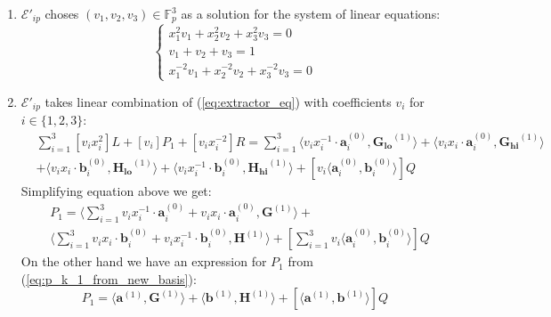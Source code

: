 \documentclass[../lecture-notes-148x210.tex]{subfiles}
\begin{document}
\begin{enumerate}
    \item $\mathcal{E}'_{ip}$ choses $(v_1, v_2, v_3) \in \mathbb{F}_p^3 $ as a solution for the system of linear equations:
        \begin{equation}
            \begin{cases}
                x_1^2 v_1 + x_2^2 v_2 + x_3^2 v_3 = 0 \\
                v_1 + v_2 + v_3 = 1 \\
                x_1^{-2} v_1 + x_2^{-2} v_2 + x_3^{-2} v_3 = 0
            \end{cases}
            \label{eq:extractor_v}
        \end{equation}
    \item $\mathcal{E}'_{ip}$ takes linear combination of (\ref{eq:extractor_eq}) with coefficients $v_i$ for $i \in \{ 1,2,3 \}$:
        \begin{equation*}
            \begin{aligned}
                & \sum_{i=1}^3 [v_i x_i^2]L + [v_i]P_1 + [v_i x_i^{-2}]R = \sum_{i=1}^3 \langle v_i x_i^{-1} \cdot \mathbf{a}_i^{(0)}, \mathbf{G_{lo}}^{(1)} \rangle + \langle v_i x_i \cdot \mathbf{a}_i^{(0)}, \mathbf{G_{hi}}^{(1)} \rangle \\
                &+ \langle v_i x_i \cdot \mathbf{b}_i^{(0)}, \mathbf{H_{lo}}^{(1)} \rangle + \langle v_i x_i^{-1} \cdot \mathbf{b}_i^{(0)}, \mathbf{H_{hi}}^{(1)} \rangle + [v_i \langle \mathbf{a}_i^{(0)}, \mathbf{b}_i^{(0)} \rangle]Q
            \end{aligned}
        \end{equation*}
        Simplifying equation above we get:
        \begin{equation}
            \begin{aligned}
                & P_1 = \langle \sum_{i=1}^3 v_i x_i^{-1} \cdot \mathbf{a}_i^{(0)} + v_i x_i \cdot \mathbf{a}_i^{(0)}, \mathbf{G}^{(1)} \rangle +\\ 
                & \langle \sum_{i=1}^3 v_i x_i \cdot \mathbf{b}_i^{(0)} + v_i x_i^{-1} \cdot \mathbf{b}_i^{(0)}, \mathbf{H}^{(1)} \rangle + [\sum_{i=1}^3 v_i \langle \mathbf{a}_i^{(0)}, \mathbf{b}_i^{(0)} \rangle]Q
            \end{aligned}
            \label{eq:extractor_p1}
        \end{equation}
        On the other hand we have an expression for $P_1$ from (\ref{eq:p_k_1_from_new_basis}):
        \begin{equation}
            P_{1} = \langle \mathbf{a}^{(1)}, \mathbf{G}^{(1)} \rangle + \langle \mathbf{b}^{(1)}, \mathbf{H}^{(1)} \rangle + [\langle \mathbf{a}^{(1)}, \mathbf{b}^{(1)} \rangle]Q

\end{equation}
\end{enumerate}
\end{document}
